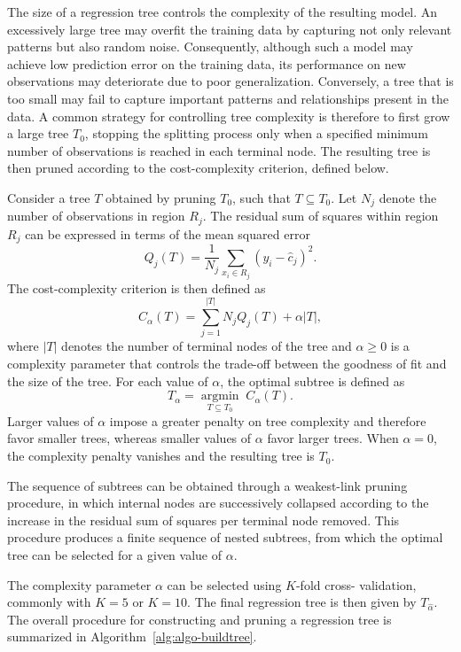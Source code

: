 The size of a regression tree controls the complexity of the resulting
model. An excessively large tree may overfit the training data by capturing
not only relevant patterns but also random noise. Consequently, although
such a model may achieve low prediction error on the training data, its
performance on new observations may deteriorate due to poor generalization.
Conversely, a tree that is too small may fail to capture important patterns
and relationships present in the data. A common strategy for controlling
tree complexity is therefore to first grow a large tree $T_0$, stopping the
splitting process only when a specified minimum number of observations is
reached in each terminal node. The resulting tree is then pruned according
to the cost-complexity criterion, defined below.

Consider a tree $T$ obtained by pruning $T_0$, such that $T \subseteq T_0$.
Let $N_j$ denote the number of observations in region $R_j$. The residual
sum of squares within region $R_j$ can be expressed in terms of the
mean squared error
\begin{equation}
Q_j(T)
=
\frac{1}{N_j}
\sum_{x_i \in R_j}
\left(y_i-\hat{c}_j\right)^2.
\end{equation}
The cost-complexity criterion is then defined as
\begin{equation}
C_{\alpha}(T)
=
\sum_{j=1}^{|T|}
N_j Q_j(T)
+
\alpha |T|,
\end{equation}
where $|T|$ denotes the number of terminal nodes of the tree and
$\alpha\geq0$ is a complexity parameter that controls the trade-off between
the goodness of fit and the size of the tree. For each value of $\alpha$,
the optimal subtree is defined as
\begin{equation}
T_{\alpha}
=
\underset{T\subseteq T_0}{\operatorname{argmin}}
\; C_{\alpha}(T).
\end{equation}
Larger values of $\alpha$ impose a greater penalty on tree complexity and
therefore favor smaller trees, whereas smaller values of $\alpha$ favor
larger trees. When $\alpha=0$, the complexity penalty vanishes and the
resulting tree is $T_0$.

The sequence of subtrees can be obtained through a weakest-link pruning
procedure, in which internal nodes are successively collapsed according
to the increase in the residual sum of squares per terminal node removed.
This procedure produces a finite sequence of nested subtrees, from which
the optimal tree can be selected for a given value of $\alpha$.

The complexity parameter $\alpha$ can be selected using $K$-fold cross-
validation, commonly with $K=5$ or $K=10$. The final regression tree is
then given by $T_{\hat{\alpha}}$. The overall procedure for constructing
and pruning a regression tree is summarized in
Algorithm~\ref{alg:algo-buildtree}.

